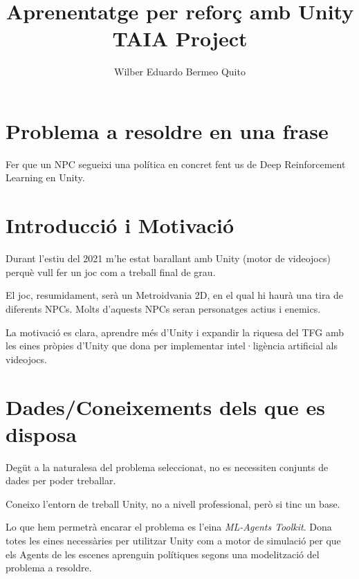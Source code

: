 \documentclass{article}
\title{ \textbf{ Aprenentatge per reforç amb Unity} 
\\ {\Large TAIA Project}}
\author{\small Wilber Eduardo Bermeo Quito }
\begin{document}
\maketitle

    \maketitle
    \thispagestyle{empty}
    \newpage
    
    \tableofcontents
    \newpage
    
    
    \section{Problema a resoldre en una frase}
    
    Fer que un NPC segueixi una política en concret fent us de Deep Reinforcement Learning en Unity.

    \section{Introducció i Motivació}
    
    Durant l’estiu del 2021 m’he estat barallant amb Unity (motor de videojocs) perquè vull fer un joc com a treball final de grau.
    
    El joc, resumidament, serà un Metroidvania 2D, en el qual hi haurà una tira de diferents NPCs. Molts d’aquests NPCs seran personatges actius i enemics.

    La motivació es clara, aprendre més d'Unity i expandir la riquesa del TFG amb les eines pròpies d’Unity que dona per implementar intel·ligència artificial als videojocs.  
    
    \section{Dades/Coneixements dels que es disposa}
    
    Degüt a la naturalesa del problema seleccionat, no es necessiten conjunts de dades per poder treballar.

    Coneixo l’entorn de treball Unity, no a nivell professional, però si tinc un base. 
    
    Lo que hem permetrà encarar el problema es l'eina \textit{ML-Agents Toolkit}. Dona totes les eines necessàries per utilitzar Unity com a motor de simulació per que els Agents de les escenes aprenguin polítiques segons una modelització del problema a resoldre.
    
\end{document}
